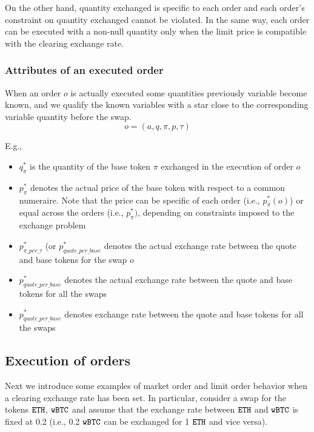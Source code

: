 \documentclass[11pt, reqno]{amsart}
\theoremstyle{definition}
\theoremstyle{remark}
\newcommand{\BTC}{\textnormal{\texttt{wBTC}}}
\newcommand{\ETH}{\textnormal{\texttt{ETH}}}
\begin{document}
On the other hand, quantity exchanged is specific to each order and each
order's constraint on quantity exchanged cannot be violated. In the same way,
each order can be executed with a non-null quantity only when the limit price
is compatible with the clearing exchange rate.

\subsubsection{Attributes of an executed order}
When an order $o$ is actually executed some quantities previously variable
become known, and we qualify the known variables with a star close to the
corresponding variable quantity before the swap.
\[
	o = (a, q, \pi, p, \tau)
\]

E.g.,
\begin{itemize}
	\item $q_{\pi}^*$ is the quantity of the base token $\pi$ exchanged in the
	      execution of order $o$
	\item $p_{\pi}^*$ denotes the actual price of the base token with respect
          to a common numeraire. Note that the price can
          be specific of each order (i.e., $p_{\pi}^*(o)$) or equal across the orders
          (i.e., $p_{\pi}^*)$, depending on constraints imposed to the exchange problem
    \item $p_{\pi\_per\_\tau}^*$ (or $p_{quote\_per\_base}^*$ denotes the actual exchange
          rate between the quote and base tokens for the swap $o$
    \item $p_{quote\_per\_base}^*$ denotes the actual exchange rate between the
          quote and base tokens for all the swaps
	\item $p_{quote\_per\_base}^*$ denotes exchange rate between the quote
	      and base tokens for all the swaps
\end{itemize}

\subsection{Execution of orders}
Next we introduce some examples of market order and limit order behavior when
a clearing exchange rate has been set.
In particular, consider a swap for the tokens $\ETH$, $\BTC$ and assume that
the exchange rate between $\ETH$ and $\BTC$ is fixed at 0.2 (i.e.,
0.2 $\BTC$ can be exchanged for 1 $\ETH$ and vice versa).
\end{document}
